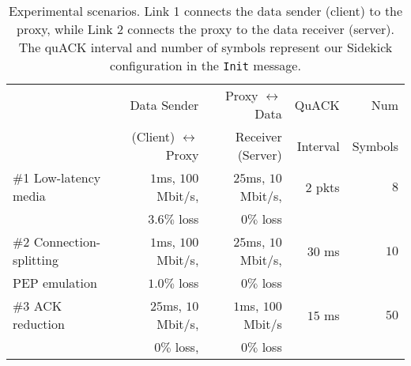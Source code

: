 \begin{table*}[t]
  \centering
  \begin{tabular}{lrrrr}
    \toprule
    & Data Sender  & Proxy $\leftrightarrow$ Data & QuACK     & Num \\
    & (Client) $\leftrightarrow$ Proxy & Receiver (Server) & Interval & Symbols \\
    \midrule
    \#1 Low-latency media & $1$ms, $100$ Mbit/s, & $25$ms, $10$ Mbit/s, & $2$ pkts & $8$ \\
                          & $3.6\%$ loss         & $0\%$ loss           &          &     \\

    \#2 Connection-splitting & $1$ms, $100$ Mbit/s, & $25$ms, $10$ Mbit/s, & $30$ ms & $10$ \\
    PEP emulation            & $1.0\%$ loss         & $0\%$ loss           &         & \\

    \#3 ACK reduction & $25$ms, $10$ Mbit/s, & $1$ms, $100$ Mbit/s & $15$ ms & $50$ \\
                      & $0\%$ loss,          & $0\%$ loss          &         & \\
    \bottomrule
  \end{tabular}
  \caption{Experimental scenarios. Link 1 connects the data sender (client) to
  the proxy, while Link 2 connects the proxy to the data receiver (server).
  The quACK interval and number of symbols represent our Sidekick configuration
  in the \texttt{Init} message.
  }
  \label{tab:sidekick:experimental-scenarios}
\end{table*}
